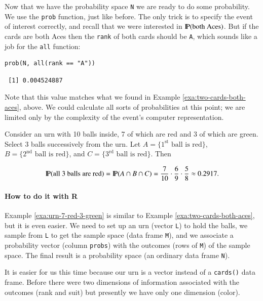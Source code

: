 \documentclass[captions=tableheading]{scrbook}
\begin{document}
Now that we have the probability space \texttt{N} we are ready to do some probability. We use the \texttt{prob} function, just like before. The only trick is to specify the event of interest correctly, and recall that we were interested in \(\P(\mbox{both Aces})\). But if the cards are both Aces then the \texttt{rank} of both cards should be \texttt{A}, which sounds like a job for the \texttt{all} function:


\begin{verbatim}
prob(N, all(rank == "A"))
\end{verbatim}

\begin{verbatim}
 [1] 0.004524887
\end{verbatim}

Note that this value matches what we found in Example \ref{exa:two-cards-both-aces}, above. We could calculate all sorts of probabilities at this point; we are limited only by the complexity of the event's computer representation. 


\begin{example}
\label{exa:urn-7-red-3-green}
Consider an urn with 10 balls inside, 7 of which are red and 3 of which are green. Select 3 balls successively from the urn. Let \( A = \{ 1^{\mathrm{st}} \mbox{ ball is red} \} \), \( B = \{ 2^{\mathrm{nd}} \mbox{ ball is red} \} \), and \( C = \{ 3^{\mathrm{rd}} \mbox{ ball is red} \} \). Then

\[
\P(\mbox{all 3 balls are red})=\P(A\cap B\cap C)=\frac{7}{10}\cdot\frac{6}{9}\cdot\frac{5}{8}\approx 0.2917.
\]

\end{example}

\paragraph*{How to do it with \textsf{R}}

Example \ref{exa:urn-7-red-3-green} is similar to Example \ref{exa:two-cards-both-aces}, but it is even easier. We need to set up an urn (vector \texttt{L}) to hold the balls, we sample from \texttt{L} to get the sample space (data frame \texttt{M}), and we associate a probability vector (column \texttt{probs}) with the outcomes (rows of \texttt{M}) of the sample space. The final result is a probability space (an ordinary data frame \texttt{N}).

It is easier for us this time because our urn is a vector instead of a \texttt{cards()} data frame. Before there were two dimensions of information associated with the outcomes (rank and suit) but presently we have only one dimension (color).
\end{document}
